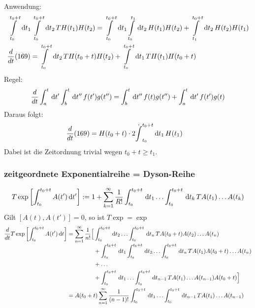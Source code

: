 \documentclass[a4paper]{scrartcl}
\newcommand{\dd}{\ensuremath \, \mathrm{d}}
\begin{document}
{Anwendung:
\begin{align}
& \int\limits_{t_0}^{t_0+t} \dd t_1 \int\limits_{t_0}^{t_0 + t} \dd t_2 \, T H(t_1) H(t_2) = \int\limits_{t_0}^{t_0 + t} \dd t_1   \int\limits_{t_0}^{t_1} \dd t_2 \, H(t_1) H(t_2) +  \int\limits_{t_1}^{t_0+t} \dd t_2 \, H(t_2) H(t_1) \\
& \frac d {dt} (169) = \int\limits_{t_0}^{t_0+t} \dd t_2 \, T H(t_0+t) H(t_2) + \int\limits_{t_0}^{t_0+t} \dd t_1 \, T H(t_1)H(t_0+t)
\end{align}
Regel:
$$ \frac d {dt} \int_a^t \dd t' \int_b^t \dd t'' \, f(t') g(t'') = \int_b^t \dd t'' \, f(t) g(t'') + \int_a^t \dd t' \, f(t') g(t)$$
Daraus folgt:
\begin{align}
\frac d {dt} (169) & = H(t_0 + t) \cdot 2\dot \int_{t_0}^{t_0 + t} \dd t_1 \, H(t_1)
\end{align}
Dabei ist die Zeitordnung trivial wegen $t_0 + t \geq t_1$.

\subsubsection*{zeitgeordnete Exponentialreihe = Dyson-Reihe}
\begin{align}
T \exp \left[ \int_{t_0}^{t_0+t} A(t') \dd t' \right] := 1 + \sum_{k=1}^\infty \frac 1  {R!} \int_{t_0}^{t_0+t} \dd t_1 \ldots \int_{t_0}^{t_0 + t} \dd t_k \, T A(t_1) \ldots A(t_k)
\end{align}
Gilt $[A(t), A(t')] = 0$, so ist $T \exp = \exp$
\begin{align*}
\frac d{dt} T \exp \left[ \int_{t_0}^{t_0+t} A(t') \dd t \right] &=  \sum_{n=1}^\infty \frac1{n!}
\Big[
\begin{aligned}[t]
& \int_{t_0}^{t_0 + t} \dd t_2 \ldots \int_{t_0}^{t_0+t} \dd t_n \,  T A(t_0+t) A(t_2) \ldots A(t_n)  \\
& + \int_{t_0}^{t_0 + t} \dd t_1 \int_{t_0}^{t_0+t} \dd t_3 \ldots \int_{t_0}^{t_0+t} \dd t_n \,  TA(t_1) A(t_0 + t) \ldots A(t_n) \\ & +  \ldots \\
 & + \int_{t_0}^{t_0+t} \dd t_1 \ldots \int_{t_0}^{t_0+t} \dd t_{n-1} \, T A(t_1) \ldots A(t_{n-1}) A(t_0+t) \Big]
\end{aligned}  \\ 
& = A(t_0+t) \sum_{n=1}^\infty \frac1{(n-1)!} \int_{t_0}^{t_0+t}\dd t_1 \ldots \int_{t_0}^{t_0 +t} \dd t_{n-1} \, T A(t_1) \ldots A(t_{n-1})
\end{align*}

}
\end{document}
